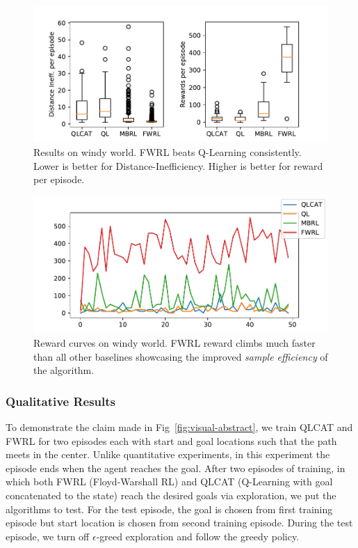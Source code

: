 \begin{figure}
  \includegraphics[width=\columnwidth]{./media/metrics-windy-world.pdf}
  \caption{Results on windy world. FWRL beats Q-Learning
    consistently. Lower is better for Distance-Inefficiency. Higher
    is better for reward per episode. }
  \label{fig:ql-fw-windy-world-results}%
\end{figure}

\begin{figure}
  \includegraphics[width=\columnwidth]{./media/rewards-metrics-windy-world.pdf}
  \caption{Reward curves on windy world. FWRL reward climbs much
    faster than all other baselines showcasing the improved \emph{sample
      efficiency} of the algorithm.}
  \label{fig:ql-fw-windy-world-reward-curves}%
\end{figure}


\subsubsection{Qualitative Results}
To demonstrate the claim made in Fig~\ref{fig:visual-abstract}, we train QLCAT
and FWRL for two episodes each with start and goal locations such that the path
meets in the center. Unlike quantitative experiments, in this experiment the
episode ends when the agent reaches the goal.
After two episodes of training, in which both FWRL (Floyd-Warshall RL) and QLCAT
(Q-Learning with goal concatenated to the state) reach the desired
goals via exploration, we put the algorithms to test.
For the test episode, the goal is chosen from first training episode but start
location is chosen from second training episode.
During the test episode,
we turn off $\epsilon$-greed exploration and follow the greedy policy.

